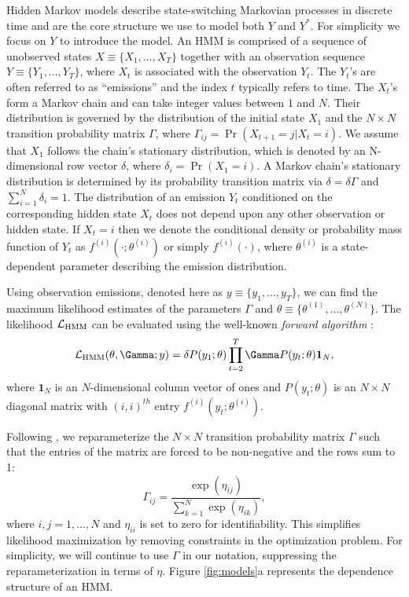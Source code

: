 Hidden Markov models describe state-switching Markovian processes in discrete time and are the core structure we use to model both $Y$ and $Y^*$. For simplicity we focus on $Y$ to introduce the model. An HMM is comprised of a sequence of unobserved states $X \equiv \big\{X_1, \ldots, X_T\big\}$ together with an observation sequence $Y \equiv \big\{Y_1, \ldots, Y_T\big\}$, where $X_t$ is associated with the observation $Y_t$. The $Y_t$'s are often referred to as ``emissions'' and the index $t$ typically refers to time. 
The $X_t$'s form a Markov chain and can take integer values between $1$ and $N$. Their distribution is governed by the distribution of the initial state $X_1$ and the $N \times N$ transition probability matrix $\Gamma$, where $\Gamma_{ij} = \Pr(X_{t+1} = j | X_t = i)$. 
%
We assume that $X_1$ follows the chain's stationary distribution, which is denoted by an N-dimensional row vector $\delta$, where
$\delta_i = \Pr(X_1 = i).$
A Markov chain's stationary distribution is determined by its probability transition matrix via $\delta = \delta \Gamma$ and $\sum_{i=1}^N \delta_i = 1$.
%
The distribution of an emission $Y_t$ conditioned on the corresponding hidden state $X_t$ does not depend upon any other observation or hidden state.
%
If $X_t=i$ then we denote the conditional density or probability mass function of $Y_t$ as $f^{(i)}(\cdot ; \theta^{(i)})$ or simply $f^{(i)}(\cdot)$, where $\theta^{(i)}$ is a state-dependent parameter describing the emission distribution.
%

Using observation emissions, denoted here as $y \equiv \{y_1,\ldots,y_T\}$, we can find the maximum likelihood estimates of the parameters $\Gamma$ and $\theta \equiv \{\theta^{(1)},\ldots,\theta^{(N)}\}$. The likelihood $\mathcal{L}_{\text{HMM}}$ can be evaluated using the well-known \textit{forward algorithm} \citep{Zucchini:2016}:
%
$$\calL_{\text{HMM}}(\theta,\Gamma;y) = \delta P(y_1;\theta) \prod_{t=2}^T \Gamma P(y_t;\theta) \mathbf{1}_N,$$
%
where $\mathbf{1}_N$ is an $N$-dimensional column vector of ones and
%
$P(y_t;\theta)$ is an $N \times N$ diagonal matrix with $(i,i)^{th}$ entry $f^{(i)}(y_t; \theta^{(i)})$.
%

Following \citet{Barajas:2017}, we reparameterize the $N \times N$ transition probability matrix $\Gamma$ such that the entries of the matrix are forced to be non-negative and the rows sum to 1:
%
\[
\Gamma_{ij} = \frac{\exp(\eta_{ij})}{\sum_{k=1}^N \exp(\eta_{ik})}, 
\]
%
where $i,j = 1,\ldots,N$ and $\eta_{ii}$ is set to zero for identifiability. This simplifies likelihood maximization by removing constraints in the optimization problem. For simplicity, we will continue to use $\Gamma$ in our notation, suppressing the reparameterization in terms of $\eta$. Figure \ref{fig:models}a represents the dependence structure of an HMM.

